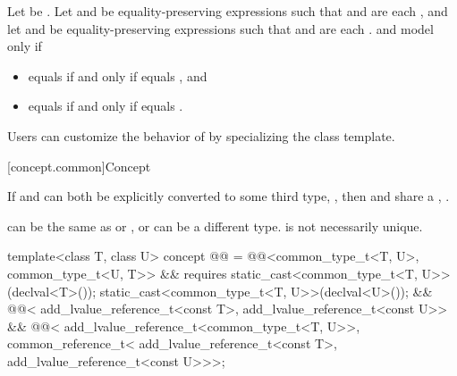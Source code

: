 \begin{itemdescr}
\pnum
Let  be .
Let  and  be equality-preserving
expressions such that
 and  are each , and
let  and  be equality-preserving expressions such that
 and  are each .
 and  model 
only if
\begin{itemize}
\item {} equals  if and only if
   equals , and
\item {} equals  if and only if
   equals .
\end{itemize}

\pnum
\begin{note}
Users can customize the behavior of  by specializing
the  class template.
\end{note}
\end{itemdescr}

[concept.common]{Concept }

\pnum
If  and  can both be explicitly converted to some third type,
, then  and  share a ,
.
\begin{note}
 can be the same as  or , or can be a
different type.  is not necessarily unique.
\end{note}

\begin{itemdecl}
template<class T, class U>
  concept @@ =
    @@<common_type_t<T, U>, common_type_t<U, T>> &&
    requires {
      static_cast<common_type_t<T, U>>(declval<T>());
      static_cast<common_type_t<T, U>>(declval<U>());
    } &&
    @@<
      add_lvalue_reference_t<const T>,
      add_lvalue_reference_t<const U>> &&
    @@<
      add_lvalue_reference_t<common_type_t<T, U>>,
      common_reference_t<
        add_lvalue_reference_t<const T>,
        add_lvalue_reference_t<const U>>>;
\end{itemdecl}

